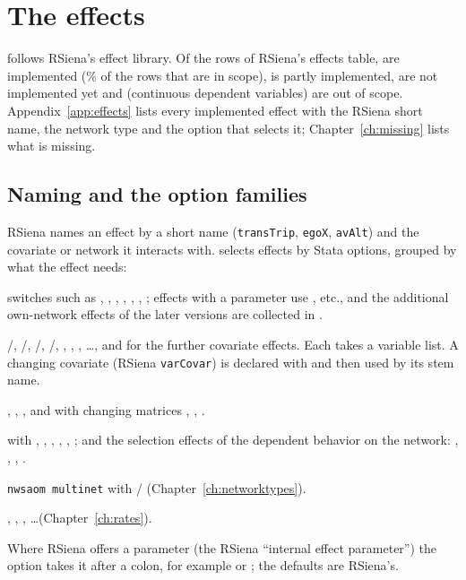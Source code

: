 \chapter{The effects}\label{ch:effects}
\nwsaom{} follows RSiena's effect library. Of the \nTotal{} rows of RSiena's effects table, \nImpl{} are implemented (\pctImpl\% of the \nPlannable{} rows that are in scope), \nPartial{} is partly implemented, \nNotImpl{} are not implemented yet and \nNotPlanned{} (continuous dependent variables) are out of scope. Appendix~\ref{app:effects} lists every implemented effect with the RSiena short name, the network type and the \nwsaom{} option that selects it; Chapter~\ref{ch:missing} lists what is missing.

\section{Naming and the option families}
RSiena names an effect by a short name (\texttt{transTrip}, \texttt{egoX}, \texttt{avAlt}) and the covariate or network it interacts with. \nwsaom{} selects effects by Stata options, grouped by what the effect needs:
\begin{description}[leftmargin=0pt,labelindent=0pt]
\item[Structural effects] switches such as , , , , , , ; effects with a parameter use ,  etc., and the additional own-network effects of the later versions are collected in .
\item[Covariate effects] /, /, /, /, , , , \ldots, and  for the further covariate effects. Each takes a variable list. A changing covariate (RSiena \texttt{varCovar}) is declared with  and then used by its stem name.
\item[Dyadic covariates] , , , and with changing matrices , , .
\item[Behavior effects]  with , , , , , ; and the selection effects of the dependent behavior on the network: , , , .
\item[Several networks] \texttt{nwsaom multinet} with / (Chapter~\ref{ch:networktypes}).
\item[Rate effects] , , , \ldots (Chapter~\ref{ch:rates}).
\end{description}
Where RSiena offers a parameter (the RSiena ``internal effect parameter'') the option takes it after a colon, for example  or ; the defaults are RSiena's.

